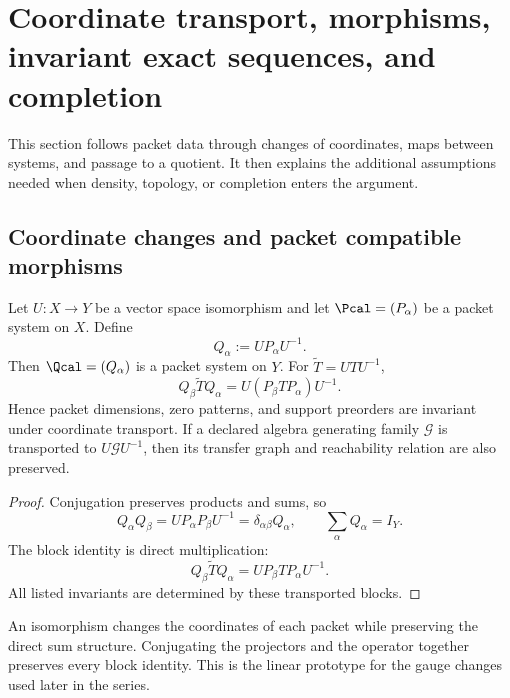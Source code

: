 \section{Coordinate transport, morphisms, invariant exact sequences, and completion}
\begin{readerroadmap}
This section follows packet data through changes of coordinates, maps between systems, and passage to a quotient.  It then explains the additional assumptions needed when density, topology, or completion enters the argument.
\end{readerroadmap}
\subsection{Coordinate changes and packet compatible morphisms}

\begin{theorem}
\label{thm:coordinate-transport}
Let $U:X\to Y$ be a vector space isomorphism and let $\Pcal=(P_\alpha)$ be a packet system on $X$.  Define
\[
Q_\alpha:=UP_\alpha U^{-1}.
\]
Then $\Qcal=(Q_\alpha)$ is a packet system on $Y$.  For $\widetilde T=UTU^{-1}$,
\[
\boxed{
Q_\beta\widetilde TQ_\alpha
=
U(P_\beta TP_\alpha)U^{-1}.
}
\]
Hence packet dimensions, zero patterns, and support preorders are invariant under coordinate transport.  If a declared algebra generating family $\mathcal G$ is transported to $U\mathcal G U^{-1}$, then its transfer graph and reachability relation are also preserved.
\end{theorem}

\begin{proof}
Conjugation preserves products and sums, so
\[
Q_\alpha Q_\beta
=UP_\alpha P_\beta U^{-1}
=\delta_{\alpha\beta}Q_\alpha,
\qquad
\sum_\alpha Q_\alpha=I_Y.
\]
The block identity is direct multiplication:
\[
Q_\beta\widetilde TQ_\alpha
=UP_\beta TP_\alpha U^{-1}.
\]
All listed invariants are determined by these transported blocks.
\end{proof}

\begin{interpretation}
An isomorphism changes the coordinates of each packet while preserving the direct sum structure.  Conjugating the projectors and the operator together preserves every block identity.  This is the linear prototype for the gauge changes used later in the series.
\end{interpretation}


